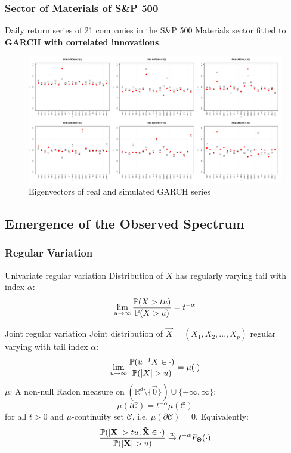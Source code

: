 \documentclass{beamer}
\begin{document}
\begin{frame}
  \frametitle{Sector of Materials of S\&P 500}
  Daily return series of 21 companies in the S\&P 500 Materials sector
  fitted to {\bf GARCH with correlated innovations}.
  \begin{figure}[htb!]
    \centering
    \includegraphics[width=1.0\linewidth]{Materials_eigenvectors1.pdf}
    \caption{\scriptsize Eigenvectors of real and simulated GARCH series}
  \end{figure}
\end{frame}

\subsection{Emergence of the Observed Spectrum}
\begin{frame}
  \frametitle{Regular Variation}
  \begin{minipage}[t]{0.4\linewidth}
    \textcolor[HTML]{990033}{Univariate regular variation}
    Distribution of $X$ has regularly varying tail with index $\alpha$:
    \[
    \lim_{u \to \infty}
    {
      \P(X > t u)
      \over
      \P(X > u)
    } = t^{-\alpha}
    \]
  \end{minipage}\hfill
  \begin{minipage}[t]{0.55\linewidth}
    \textcolor[HTML]{990033}{Joint regular variation}    
    Joint distribution of $\vec X = (X_1, X_2, ..., X_p)$ regular
    varying with tail index $\alpha$:
    \[
    \lim_{u \to \infty}
    {
      \P(u^{-1} X \in \cdot)
      \over
      \P(|X|>u)
    } = \mu(\cdot)
    \]
    $\mu$: A non-null Radon measure on $(\mathbb R^d \setminus \{\vec
    0\}) \cup \{-\infty, \infty\}$:
    \[
      \mu(t \mathcal C) =
      t^{-\alpha} \mu(\mathcal C)
    \]
    for all $t > 0$ and $\mu$-continuity set $\mathcal C$,
    i.e. $\mu(\partial \mathcal C) = 0$. Equivalently:
    \[
    {
      \P(|\vec X| > t u, \vec{\tilde X} \in \cdot)
      \over
      \P(|\vec X| > u)
    } \overset{w}{\to} t^{-\alpha} P_\Theta(\cdot)
    \]
  \end{minipage}
\end{frame}
\end{document}
